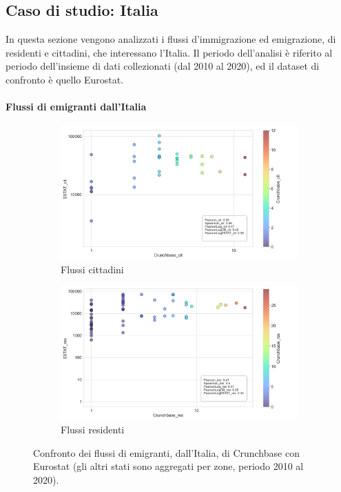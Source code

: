 \subsection{Caso di studio: Italia}
In questa sezione vengono analizzati i flussi d'immigrazione ed emigrazione, di residenti e cittadini, che interessano l'Italia. Il periodo dell'analisi è riferito al periodo dell'insieme di dati collezionati (dal 2010 al 2020), ed il dataset di confronto è quello Eurostat.
\paragraph{Flussi di emigranti dall'Italia}
\label{ita_flows}
\begin{figure}[tb]
    \centering
    \begin{subfigure}{\textwidth}
        \centering
        \includegraphics[width=1.0\textwidth]{images/flows/aggregated/filtered_nationality/ita/ESTAT_cit_True.png}
        \caption{Flussi cittadini}
        \label{fig:italia_nat_true}
    \end{subfigure}
    \begin{subfigure}{\textwidth}
        \includegraphics[width=1.0\textwidth]{images/flows/aggregated/filtered_nationality/ita/ESTAT_res_True.png}
        \caption{Flussi residenti}
        \label{fig:italia_res_true}
    \end{subfigure}
    \caption{Confronto dei flussi di emigranti, dall'Italia, di Crunchbase con Eurostat (gli altri stati sono aggregati per zone, periodo 2010 al 2020).}
    \label{fig:italiatrue}
\end{figure}

